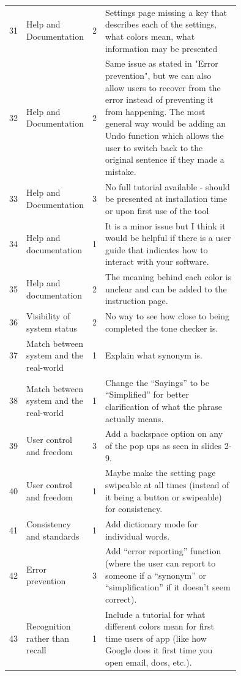 \documentclass[acmsmall,screen,authorversion,nonacm]{acmart}
\begin{document}
\begin{center}
\begin{longtable}{|l|p{0.15\linewidth}|l|p{0.6\linewidth}|}
31 & Help and Documentation & 2 & Settings page missing a key that describes each of the settings, what colors mean, what information may be presented \\ \cline{1-4}
32 & Help and Documentation & 2 & Same issue as stated in "Error prevention", but we can also allow users to recover from the error instead of preventing it from happening. The most general way would be adding an Undo function which allows the user to switch back to the original sentence if they made a mistake. \\ \cline{1-4}
33 & Help and Documentation & 3 & No full tutorial available - should be presented at installation time or upon first use of the tool \\ \cline{1-4}
34 & Help and documentation & 1 & It is a minor issue but I think it would be helpful if there is a user guide that indicates how to interact with your software. \\ \cline{1-4}
35 & Help and documentation & 2 & The meaning behind each color is unclear and can be added to the instruction page. \\ \cline{1-4}
36 & Visibility of system status & 2 &  No way to see how close to being completed the tone checker is. \\ \cline{1-4}
37 & Match between system and the real-world & 1 & Explain what synonym is. \\ \cline{1-4}
38 & Match between system and the real-world & 1 & Change the “Sayings” to be “Simplified” for better clarification of what the phrase actually means. \\ \cline{1-4}
39 &  User control and freedom & 3 & Add a backspace option on any of the pop ups as seen in slides 2-9. \\ \cline{1-4}
40 &  User control and freedom & 1 & Maybe make the setting page swipeable at all times (instead of it being a button or swipeable) for consistency. \\ \cline{1-4}
41 & Consistency and standards & 1 & Add dictionary mode for individual words. \\ \cline{1-4}
42 & Error prevention & 3 & Add “error reporting” function (where the user can report to someone if a “synonym” or “simplification” if it doesn’t seem correct). \\ \cline{1-4}
43 & Recognition rather than recall & 1 &  Include a tutorial for what different colors mean for first time users of app (like how Google does it first time you open email, docs, etc.). \\ \cline{1-4}

\end{longtable}
\end{center}
\end{document}
